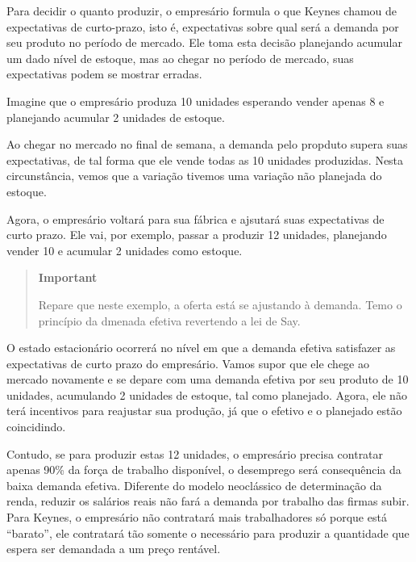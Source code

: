 \documentclass[
  brazilian,
  letterpaper,
  DIV=11,
  numbers=noendperiod]{scrreprt}
\begin{document}
Para decidir o quanto produzir, o empresário formula o que Keynes chamou
de expectativas de curto-prazo, isto é, expectativas sobre qual será a
demanda por seu produto no período de mercado. Ele toma esta decisão
planejando acumular um dado nível de estoque, mas ao chegar no período
de mercado, suas expectativas podem se mostrar erradas.

\begin{tcolorbox}[enhanced jigsaw, arc=.35mm, bottomrule=.15mm, bottomtitle=1mm, breakable, colback=white, colbacktitle=quarto-callout-note-color!10!white, colframe=quarto-callout-note-color-frame, coltitle=black, left=2mm, leftrule=.75mm, opacityback=0, opacitybacktitle=0.6, rightrule=.15mm, title=\textcolor{quarto-callout-note-color}{\faInfo}\hspace{0.5em}{Exemplo didático}, titlerule=0mm, toprule=.15mm, toptitle=1mm]

Imagine que o empresário produza 10 unidades esperando vender apenas 8 e
planejando acumular 2 unidades de estoque.

Ao chegar no mercado no final de semana, a demanda pelo propduto supera
suas expectativas, de tal forma que ele vende todas as 10 unidades
produzidas. Nesta circunstância, vemos que a variação tivemos uma
variação não planejada do estoque.

Agora, o empresário voltará para sua fábrica e ajsutará suas
expectativas de curto prazo. Ele vai, por exemplo, passar a produzir 12
unidades, planejando vender 10 e acumular 2 unidades como estoque.

\begin{quote}
\textbf{Important}

Repare que neste exemplo, a oferta está se ajustando à demanda. Temo o
princípio da dmenada efetiva revertendo a lei de Say.
\end{quote}

O estado estacionário ocorrerá no nível em que a demanda efetiva
satisfazer as expectativas de curto prazo do empresário. Vamos supor que
ele chege ao mercado novamente e se depare com uma demanda efetiva por
seu produto de 10 unidades, acumulando 2 unidades de estoque, tal como
planejado. Agora, ele não terá incentivos para reajustar sua produção,
já que o efetivo e o planejado estão coincidindo.

Contudo, se para produzir estas 12 unidades, o empresário precisa
contratar apenas 90\% da força de trabalho disponível, o desemprego será
consequência da baixa demanda efetiva. Diferente do modelo neoclássico
de determinação da renda, reduzir os salários reais não fará a demanda
por trabalho das firmas subir. Para Keynes, o empresário não contratará
mais trabalhadores só porque está ``barato'', ele contratará tão somente
o necessário para produzir a quantidade que espera ser demandada a um
preço rentável.

\end{tcolorbox}
\end{document}
